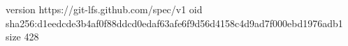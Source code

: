 version https://git-lfs.github.com/spec/v1
oid sha256:d1eedcde3b4af0f88ddcd0edaf63afe6f9d56d4158c4d9ad7f000ebd1976adb1
size 428
